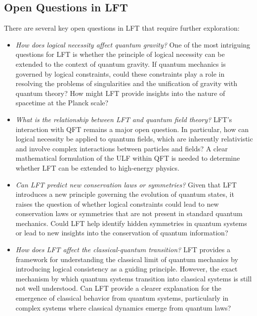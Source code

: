 \subsection{Open Questions in LFT}

There are several key open questions in LFT that require further exploration:

\begin{itemize}
    \item \textit{How does logical necessity affect quantum gravity?} One of the most intriguing questions for LFT is whether the principle of logical necessity can be extended to the context of quantum gravity. If quantum mechanics is governed by logical constraints, could these constraints play a role in resolving the problems of singularities and the unification of gravity with quantum theory? How might LFT provide insights into the nature of spacetime at the Planck scale?
    
    \item \textit{What is the relationship between LFT and quantum field theory?} LFT’s interaction with QFT remains a major open question. In particular, how can logical necessity be applied to quantum fields, which are inherently relativistic and involve complex interactions between particles and fields? A clear mathematical formulation of the ULF within QFT is needed to determine whether LFT can be extended to high-energy physics.
    
    \item \textit{Can LFT predict new conservation laws or symmetries?} Given that LFT introduces a new principle governing the evolution of quantum states, it raises the question of whether logical constraints could lead to new conservation laws or symmetries that are not present in standard quantum mechanics. Could LFT help identify hidden symmetries in quantum systems or lead to new insights into the conservation of quantum information?
    
    \item \textit{How does LFT affect the classical-quantum transition?} LFT provides a framework for understanding the classical limit of quantum mechanics by introducing logical consistency as a guiding principle. However, the exact mechanism by which quantum systems transition into classical systems is still not well understood. Can LFT provide a clearer explanation for the emergence of classical behavior from quantum systems, particularly in complex systems where classical dynamics emerge from quantum laws?
\end{itemize}

